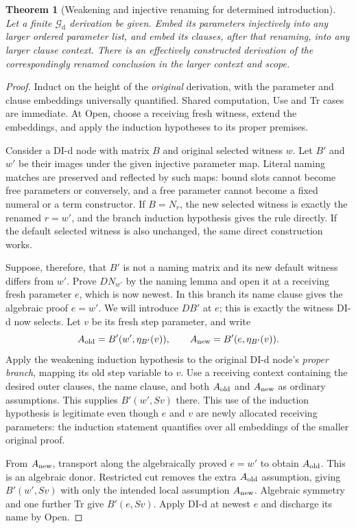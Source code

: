 \documentclass[11pt,letterpaper]{article}
\newtheorem{theorem}{Theorem}[section]
\theoremstyle{definition}\newtheorem{definition}[theorem]{Definition}
\theoremstyle{remark}\newtheorem{remark}[theorem]{Remark}
\begin{document}
\begin{theorem}[Weakening and injective renaming for determined introduction]
Let a finite $\mathcal G_{\mathrm d}$ derivation be given. Embed its parameters
injectively into any larger ordered parameter list, and embed its clauses,
after that renaming, into any larger clause context. There is an effectively
constructed derivation of the correspondingly renamed conclusion in the
larger context and scope.
\end{theorem}
\begin{proof}
Induct on the height of the \emph{original} derivation, with the parameter
and clause embeddings universally quantified. Shared computation, Use and
Tr cases are immediate. At Open, choose a receiving fresh witness, extend
the embeddings, and apply the induction hypotheses to its proper premises.

Consider a DI-d node with matrix $B$ and original selected witness $w$.
Let $B'$ and $w'$ be their images under the given injective parameter map.
Literal naming matches are preserved and reflected by such maps: bound
slots cannot become free parameters or conversely, and a free parameter
cannot become a fixed numeral or a term constructor. If $B=N_r$, the new
selected witness is exactly the renamed $r=w'$, and the branch induction
hypothesis gives the rule directly. If the default selected witness is also
unchanged, the same direct construction works.

Suppose, therefore, that $B'$ is not a naming matrix and its new default
witness differs from $w'$. Prove $D N_{w'}$ by the naming lemma and open it
at a receiving fresh parameter $e$, which is now newest. In this branch its
name clause gives the algebraic proof $e=w'$. We will introduce $D B'$ at
$e$; this is exactly the witness DI-d now selects. Let $v$ be its fresh step
parameter, and write
\[
 A_{\rm old}=B'(w',\eta_{B'}(v)),\qquad
 A_{\rm new}=B'(e,\eta_{B'}(v)).
\]
Apply the weakening induction hypothesis to the original DI-d node's
\emph{proper branch}, mapping its old step variable to $v$. Use a receiving
context containing the desired outer clauses, the name clause, and both
$A_{\rm old}$ and $A_{\rm new}$ as ordinary assumptions. This supplies
$B'(w',Sv)$ there. This use of the induction hypothesis is legitimate even
though $e$ and $v$ are newly allocated receiving parameters: the induction
statement quantifies over all embeddings of the smaller original proof.

From $A_{\rm new}$, transport along the algebraically proved $e=w'$ to
obtain $A_{\rm old}$. This is an algebraic donor. Restricted cut removes the
extra $A_{\rm old}$ assumption, giving $B'(w',Sv)$ with only the intended
local assumption $A_{\rm new}$. Algebraic symmetry and one further Tr give
$B'(e,Sv)$. Apply DI-d at newest $e$ and discharge its name by Open.


\end{proof}
\end{document}
